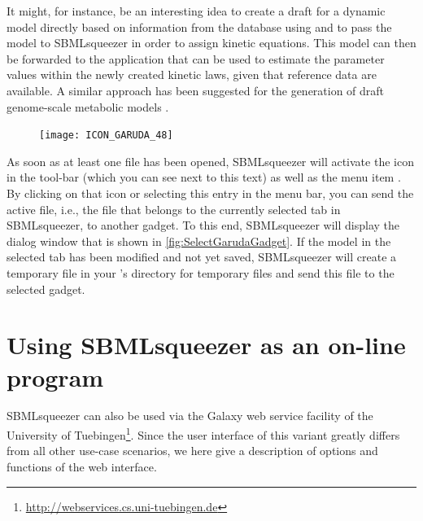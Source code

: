 It might, for instance, be an interesting idea to create a draft for a dynamic model directly based on information from the \KEGG database \citep{Kanehisa2000a} using \KEGGtranslator \citep{Wrzodek2011, Wrzodek2013} and to pass the model to SBMLsqueezer in order to assign kinetic equations. This model can then be forwarded to the application \SBMLsimulator \citep{Keller2013, Keller2014} that can be used to estimate the parameter values within the newly created kinetic laws, given that reference data are available.
A similar approach has been suggested for the generation of draft genome-scale metabolic models \citep{Buechel2013}.

\begin{figure}
\vspace{\wrapfigspace}
\texttt{[image: ICON\_GARUDA\_48]}
\end{figure}
As soon as at least one \SBML file has been opened, SBMLsqueezer will activate the \Garuda icon in the tool-bar (which you can see next to this text) as well as the menu item .
By clicking on that icon or selecting this entry in the menu bar, you can send the active file, i.e., the file that belongs to the currently selected tab in SBMLsqueezer, to another gadget.
To this end, SBMLsqueezer will display the dialog window that is shown in \vref{fig:SelectGarudaGadget}.
If the model in the selected tab has been modified and not yet saved, SBMLsqueezer will create a temporary file in your \OS's directory for temporary files and send this file to the selected gadget.

\section{Using SBMLsqueezer as an on-line program}
\label{sec:SBMLsqueezer_online_version}

SBMLsqueezer can also be used via the Galaxy web service facility \citep{Goecks2010} of the University of Tuebingen\footnote{\url{http://webservices.cs.uni-tuebingen.de}\label{fn:Webservices}}.
Since the user interface of this variant greatly differs from all other use-case scenarios, we here give a description of options and functions of the web interface.

